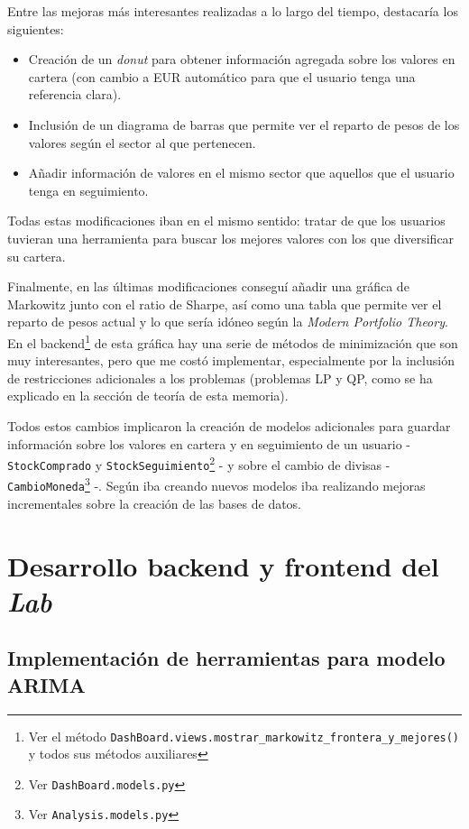 Entre las mejoras más interesantes realizadas a lo largo del tiempo, destacaría los siguientes:

\begin{itemize}
\item
Creación de un \emph{donut} para obtener información agregada sobre los valores en cartera (con cambio a EUR automático para que el usuario tenga una referencia clara). 
\item
Inclusión de un diagrama de barras que permite ver el reparto de pesos de los valores según el sector al que pertenecen. 
\item
Añadir información de valores en el mismo sector que aquellos que el usuario tenga en seguimiento. 
\end{itemize}

Todas estas modificaciones iban en el mismo sentido: tratar de que los usuarios tuvieran una herramienta para buscar los mejores valores con los que diversificar su cartera. 

Finalmente, en las últimas modificaciones conseguí añadir una gráfica de Markowitz junto con el ratio de Sharpe, así como una tabla que permite ver el reparto de pesos actual y lo que sería idóneo según la \emph{Modern Portfolio Theory}. En el backend\footnote{Ver el método \texttt{DashBoard.views.mostrar\_markowitz\_frontera\_y\_mejores()} y todos sus métodos auxiliares} de esta gráfica hay una serie de métodos de minimización que son muy interesantes, pero que me costó implementar, especialmente por la inclusión de restricciones adicionales a los problemas (problemas LP y QP, como se ha explicado en la sección de teoría de esta memoria). 

Todos estos cambios implicaron la creación de modelos adicionales para guardar información sobre los valores en cartera y en seguimiento de un usuario - \texttt{StockComprado} y \texttt{StockSeguimiento}\footnote{Ver \texttt{DashBoard.models.py}} - y sobre el cambio de divisas - \texttt{CambioMoneda}\footnote{Ver \texttt{Analysis.models.py}} -. Según iba creando nuevos modelos iba realizando mejoras incrementales sobre la creación de las bases de datos. 



\section{Desarrollo backend y frontend del \emph{Lab}}\label{desarrollo_lab}

\subsection{Implementación de herramientas para modelo ARIMA}

